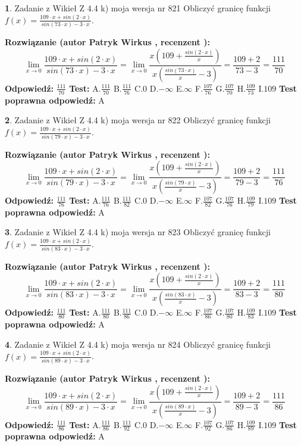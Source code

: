 \documentclass[12pt, a4paper]{article}
\theoremstyle{definition} %
\newtheorem{zad}{}
\newcommand{\zadStart}[1]{\begin{zad}#1\newline}
\newcommand{\zadStop}{\end{zad}}
\newcommand{\rozwStart}[2]{\noindent \textbf{Rozwiązanie (autor #1 , recenzent #2): }\newline}
\newcommand{\rozwStop}{\newline}
\newcommand{\odpStart}{\noindent \textbf{Odpowiedź:}\newline}
\newcommand{\odpStop}{\newline}
\newcommand{\testStart}{\noindent \textbf{Test:}\newline}
\newcommand{\testStop}{\newline}
\newcommand{\kluczStart}{\noindent \textbf{Test poprawna odpowiedź:}\newline}
\newcommand{\kluczStop}{\newline}
\begin{document}
\zadStart{Zadanie z Wikieł Z 4.4 k) moja wersja nr 821}
Obliczyć granicę funkcji $f(x)=\frac{109\cdot x +sin(2\cdot x)}{sin(73\cdot x) -3\cdot x}$.
\zadStop
\rozwStart{Patryk Wirkus}{}
$$\lim\limits_{x\to 0}\frac{109\cdot x +sin(2\cdot x)}{sin(73\cdot x) -3\cdot x}
=\lim\limits_{x\to 0}\frac{x(109+\frac{sin(2\cdot x)}{x})}{x(\frac{sin(73\cdot x)}{x}-3)}
=\frac{109+2}{73-3} = \frac{111}{70}$$
\rozwStop
\odpStart
$\frac{111}{70}$
\odpStop
\testStart
A.$\frac{111}{70}$
B.$\frac{111}{76}$
C.$0$
D.$-\infty$
E.$\infty$
F.$\frac{107}{76}$
G.$\frac{107}{70}$
H.$\frac{109}{73}$
I.$109$
\testStop
\kluczStart
A
\kluczStop



\zadStart{Zadanie z Wikieł Z 4.4 k) moja wersja nr 822}
Obliczyć granicę funkcji $f(x)=\frac{109\cdot x +sin(2\cdot x)}{sin(79\cdot x) -3\cdot x}$.
\zadStop
\rozwStart{Patryk Wirkus}{}
$$\lim\limits_{x\to 0}\frac{109\cdot x +sin(2\cdot x)}{sin(79\cdot x) -3\cdot x}
=\lim\limits_{x\to 0}\frac{x(109+\frac{sin(2\cdot x)}{x})}{x(\frac{sin(79\cdot x)}{x}-3)}
=\frac{109+2}{79-3} = \frac{111}{76}$$
\rozwStop
\odpStart
$\frac{111}{76}$
\odpStop
\testStart
A.$\frac{111}{76}$
B.$\frac{111}{82}$
C.$0$
D.$-\infty$
E.$\infty$
F.$\frac{107}{82}$
G.$\frac{107}{76}$
H.$\frac{109}{79}$
I.$109$
\testStop
\kluczStart
A
\kluczStop



\zadStart{Zadanie z Wikieł Z 4.4 k) moja wersja nr 823}
Obliczyć granicę funkcji $f(x)=\frac{109\cdot x +sin(2\cdot x)}{sin(83\cdot x) -3\cdot x}$.
\zadStop
\rozwStart{Patryk Wirkus}{}
$$\lim\limits_{x\to 0}\frac{109\cdot x +sin(2\cdot x)}{sin(83\cdot x) -3\cdot x}
=\lim\limits_{x\to 0}\frac{x(109+\frac{sin(2\cdot x)}{x})}{x(\frac{sin(83\cdot x)}{x}-3)}
=\frac{109+2}{83-3} = \frac{111}{80}$$
\rozwStop
\odpStart
$\frac{111}{80}$
\odpStop
\testStart
A.$\frac{111}{80}$
B.$\frac{111}{86}$
C.$0$
D.$-\infty$
E.$\infty$
F.$\frac{107}{86}$
G.$\frac{107}{80}$
H.$\frac{109}{83}$
I.$109$
\testStop
\kluczStart
A
\kluczStop



\zadStart{Zadanie z Wikieł Z 4.4 k) moja wersja nr 824}
Obliczyć granicę funkcji $f(x)=\frac{109\cdot x +sin(2\cdot x)}{sin(89\cdot x) -3\cdot x}$.
\zadStop
\rozwStart{Patryk Wirkus}{}
$$\lim\limits_{x\to 0}\frac{109\cdot x +sin(2\cdot x)}{sin(89\cdot x) -3\cdot x}
=\lim\limits_{x\to 0}\frac{x(109+\frac{sin(2\cdot x)}{x})}{x(\frac{sin(89\cdot x)}{x}-3)}
=\frac{109+2}{89-3} = \frac{111}{86}$$
\rozwStop
\odpStart
$\frac{111}{86}$
\odpStop
\testStart
A.$\frac{111}{86}$
B.$\frac{111}{92}$
C.$0$
D.$-\infty$
E.$\infty$
F.$\frac{107}{92}$
G.$\frac{107}{86}$
H.$\frac{109}{89}$
I.$109$
\testStop
\kluczStart
A
\kluczStop
\end{document}
